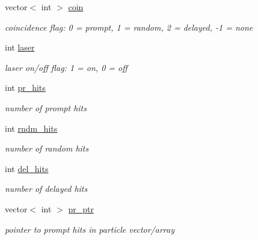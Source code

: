 \begin{DoxyCompactItemize}
\mbox{\label{classg__clx_a55dffa9b354703e991919253d935abc4}} 
vector$<$ int $>$ \hyperlink{classg__clx_a55dffa9b354703e991919253d935abc4}{coin}
\begin{DoxyCompactList}\small\item\em coincidence flag\+: 0 = prompt, 1 = random, 2 = delayed, -\/1 = none \end{DoxyCompactList}\item 
\mbox{\label{classg__clx_a636dfc5c0302782a3a021dff3f6ec53e}} 
int \hyperlink{classg__clx_a636dfc5c0302782a3a021dff3f6ec53e}{laser}
\begin{DoxyCompactList}\small\item\em laser on/off flag\+: 1 = on, 0 = off \end{DoxyCompactList}\item 
\mbox{\label{classg__clx_ab238ce0805d4af78ff43b999360a28f4}} 
int \hyperlink{classg__clx_ab238ce0805d4af78ff43b999360a28f4}{pr\+\_\+hits}
\begin{DoxyCompactList}\small\item\em number of prompt hits \end{DoxyCompactList}\item 
\mbox{\label{classg__clx_a2ca61cc109e9e0580f35a4baa5ca4b21}} 
int \hyperlink{classg__clx_a2ca61cc109e9e0580f35a4baa5ca4b21}{rndm\+\_\+hits}
\begin{DoxyCompactList}\small\item\em number of random hits \end{DoxyCompactList}\item 
\mbox{\label{classg__clx_a1205d577537a7131563e281be99f4a97}} 
int \hyperlink{classg__clx_a1205d577537a7131563e281be99f4a97}{del\+\_\+hits}
\begin{DoxyCompactList}\small\item\em number of delayed hits \end{DoxyCompactList}\item 
\mbox{\label{classg__clx_a1aecb8263b6f4ab1125ee0894e4d6ab1}} 
vector$<$ int $>$ \hyperlink{classg__clx_a1aecb8263b6f4ab1125ee0894e4d6ab1}{pr\+\_\+ptr}
\begin{DoxyCompactList}\small\item\em pointer to prompt hits in particle vector/array \end{DoxyCompactList}\item 

\end{DoxyCompactItemize}

